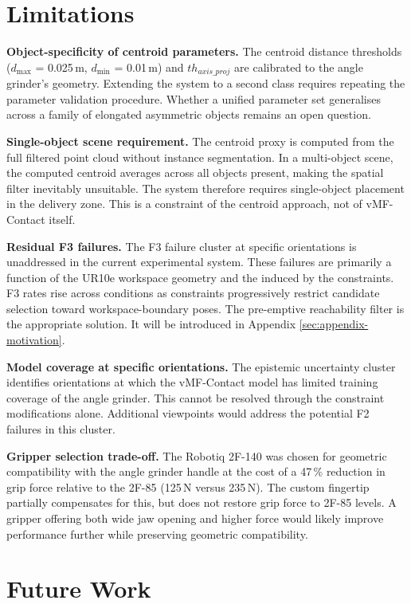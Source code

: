 \documentclass[oneside,studentpaper]{wbk}
\begin{document}
\section{Limitations}
\label{sec:limitations}

\textbf{Object-specificity of centroid parameters.} The centroid distance thresholds ($d_{\max}$ = 0.025\,m, $d_{\min}$ = 0.01\,m) and $th_{axis\_proj}$ are calibrated to the angle grinder's geometry. Extending the system to a second class requires repeating the parameter validation procedure. Whether a unified parameter set generalises across a family of elongated asymmetric objects remains an open question.

\textbf{Single-object scene requirement.} The centroid proxy is computed from the full filtered point cloud without instance segmentation. In a multi-object scene, the computed centroid averages across all objects present, making the spatial filter inevitably unsuitable. The system therefore requires single-object placement in the delivery zone. This is a constraint of the centroid approach, not of vMF-Contact itself. 

\textbf{Residual F3 failures.} The F3 failure cluster at specific orientations is unaddressed in the current experimental system. These failures are primarily a function of the UR10e workspace geometry and the induced by the constraints. F3 rates rise across conditions as constraints progressively restrict candidate selection toward workspace-boundary poses. The pre-emptive reachability filter is the appropriate solution. It will be introduced in Appendix \cref{sec:appendix-motivation}.

\textbf{Model coverage at specific orientations.} The epistemic uncertainty cluster identifies orientations at which the vMF-Contact model has limited training coverage of the angle grinder. This cannot be resolved through the constraint modifications alone. Additional viewpoints would address the potential F2 failures in this cluster.

\textbf{Gripper selection trade-off.} The Robotiq 2F-140 was chosen for geometric compatibility with the angle grinder handle at the cost of a 47\,\% reduction in grip force relative to the 2F-85 (125\,N versus 235\,N). The custom fingertip partially compensates for this, but does not restore grip force to 2F-85 levels. A gripper offering both wide jaw opening and higher force would likely improve performance further while preserving geometric compatibility.

\section{Future Work}
\label{sec:future-work}
\end{document}
